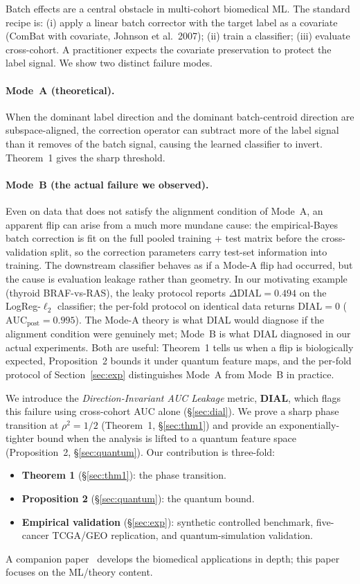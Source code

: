 \documentclass[letterpaper,11pt]{article}
\begin{document}
Batch effects are a central obstacle in multi-cohort biomedical ML.
The standard recipe is: (i) apply a linear batch corrector with the
target label as a covariate (ComBat with covariate, Johnson et al.\
2007); (ii) train a classifier; (iii) evaluate cross-cohort.  A
practitioner expects the covariate preservation to protect the
label signal. We show two distinct failure modes.

\paragraph{Mode~A (theoretical).}
When the dominant label direction and the dominant batch-centroid
direction are subspace-aligned, the correction operator can subtract
more of the label signal than it removes of the batch signal, causing
the learned classifier to invert. Theorem~1 gives the sharp threshold.

\paragraph{Mode~B (the actual failure we observed).}
Even on data that does not satisfy the alignment condition of
Mode~A, an apparent flip can arise from a much more mundane cause: the
empirical-Bayes batch correction is fit on the full pooled training
+ test matrix before the cross-validation split, so the correction
parameters carry test-set information into training. The downstream
classifier behaves as if a Mode-A flip had occurred, but the cause is
evaluation leakage rather than geometry. In our motivating example
(thyroid BRAF-vs-RAS), the leaky protocol reports
$\Delta\mathrm{DIAL} = 0.494$ on the LogReg-$\ell_2$ classifier; the
per-fold protocol on identical data returns
$\mathrm{DIAL} = 0$ ($\mathrm{AUC}_{\mathrm{post}} = 0.995$).
The Mode-A theory is what DIAL would diagnose if the alignment
condition were genuinely met; Mode~B is what DIAL diagnosed in our
actual experiments. Both are useful: Theorem~1 tells us when a
flip is biologically expected, Proposition~2 bounds it under quantum
feature maps, and the per-fold protocol of Section~\ref{sec:exp}
distinguishes Mode~A from Mode~B in practice.

We introduce the \emph{Direction-Invariant AUC Leakage} metric,
\textbf{DIAL}, which flags this failure using cross-cohort AUC
alone (\S\ref{sec:dial}).  We prove a sharp phase transition at
$\rho^2 = 1/2$ (Theorem~1, \S\ref{sec:thm1}) and provide an
exponentially-tighter bound when the analysis is lifted to a quantum
feature space (Proposition~2, \S\ref{sec:quantum}).  Our contribution
is three-fold:
\begin{itemize}
\item \textbf{Theorem 1} (\S\ref{sec:thm1}): the phase transition.
\item \textbf{Proposition 2} (\S\ref{sec:quantum}): the quantum bound.
\item \textbf{Empirical validation} (\S\ref{sec:exp}): synthetic
  controlled benchmark, five-cancer TCGA/GEO replication, and
  quantum-simulation validation.
\end{itemize}
A companion paper~\cite{thcadash_bioinfo_2026} develops the
biomedical applications in depth; this paper focuses on the ML/theory
content.
\end{document}
